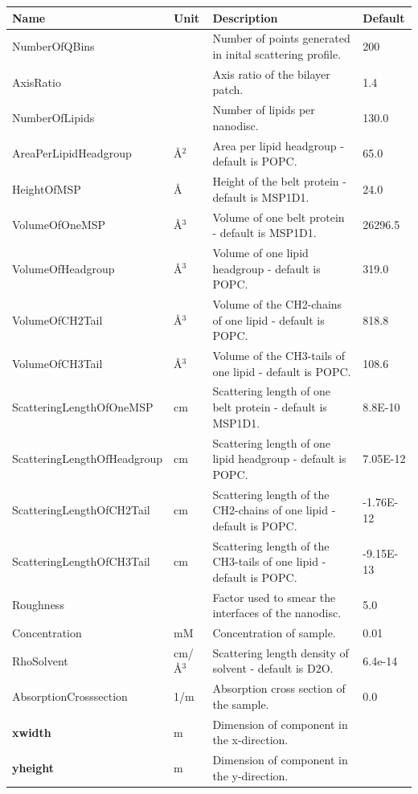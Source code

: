 \begin{longtable}{p{}p{}p{}p{}}
\toprule
\textbf{Name} & \textbf{Unit} & \textbf{Description} & \textbf{Default} \\
\midrule
\endhead
NumberOfQBins &  & Number of points generated in inital scattering profile. & 200 \\
AxisRatio &  & Axis ratio of the bilayer patch. & 1.4 \\
NumberOfLipids &  & Number of lipids per nanodisc. & 130.0 \\
AreaPerLipidHeadgroup & \AA{}$^{2}$ & Area per lipid headgroup - default is POPC. & 65.0 \\
HeightOfMSP & \AA{} & Height of the belt protein - default is MSP1D1. & 24.0 \\
VolumeOfOneMSP & \AA{}$^{3}$ & Volume of one belt protein - default is MSP1D1. & 26296.5 \\
VolumeOfHeadgroup & \AA{}$^{3}$ & Volume of one lipid headgroup - default is POPC. & 319.0 \\
VolumeOfCH2Tail & \AA{}$^{3}$ & Volume of the CH2-chains of one lipid - default is POPC. & 818.8 \\
VolumeOfCH3Tail & \AA{}$^{3}$ & Volume of the CH3-tails of one lipid - default is POPC. & 108.6 \\
ScatteringLengthOfOneMSP & cm & Scattering length of one belt protein - default is MSP1D1. & 8.8E-10 \\
ScatteringLengthOfHeadgroup & cm & Scattering length of one lipid headgroup - default is POPC. & 7.05E-12 \\
ScatteringLengthOfCH2Tail & cm & Scattering length of the CH2-chains of one lipid - default is POPC. & -1.76E-12 \\
ScatteringLengthOfCH3Tail & cm & Scattering length of the CH3-tails of one lipid - default is POPC. & -9.15E-13 \\
Roughness &  & Factor used to smear the interfaces of the nanodisc. & 5.0 \\
Concentration & mM & Concentration of sample. & 0.01 \\
RhoSolvent & cm/\AA{}$^{3}$ & Scattering length density of solvent - default is D2O. & 6.4e-14 \\
AbsorptionCrosssection & 1/m & Absorption cross section of the sample. & 0.0 \\
\textbf{xwidth} & m & Dimension of component in the x-direction. &  \\
\textbf{yheight} & m & Dimension of component in the y-direction. &  \\

\end{longtable}
